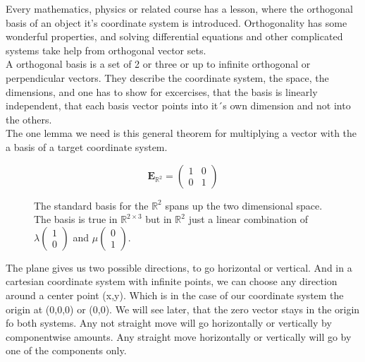 \documentclass[a4paper]{article}
\begin{document}
Every mathematics, physics or related course has a lesson, where the orthogonal basis of an object it's coordinate system is introduced. Orthogonality has some wonderful properties, and solving differential equations and other complicated systems take help from orthogonal vector sets.\\

A orthogonal basis is a set of 2 or three or up to infinite orthogonal or perpendicular vectors. They describe the coordinate system, the space, the dimensions, and one has to show for excercises, that the basis is linearly independent, that each basis vector points into it´s own dimension and not into the others.\\

The one lemma we need is this general theorem for multiplying a vector with the a basis of a target coordinate system.\\

\begin{figure}
\begin{displaymath}
    \boldsymbol{E}_{\mathbb{R}^2} = \begin{pmatrix}1 & 0 \\ 0 & 1\end{pmatrix}    
\end{displaymath}
\caption{The standard basis for the $\mathbb{R}^{2}$ spans up the two dimensional space. The basis is true in $\mathbb{R}^{2\times{3}}$ but in $\mathbb{R}^{2}$ just a linear combination of $\lambda\begin{pmatrix}1\\0\end{pmatrix}$ and $\mu\begin{pmatrix}0\\1\end{pmatrix}$. }
\end{figure}

The plane gives us two possible directions, to go horizontal or vertical. And in a cartesian coordinate system with infinite points, we can choose any direction around a center point (x,y). Which is in the case of our coordinate system the origin at (0,0,0) or (0,0). We will see later, that the zero vector stays in the origin fo both systems.
Any not straight move will go horizontally or vertically by componentwise amounts. Any straight move horizontally or vertically will go by one of the components only.\\
\end{document}
